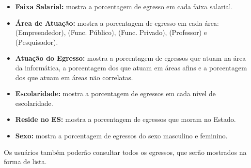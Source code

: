 \begin{itemize}
	
  	\item \textbf{Faixa Salarial:} mostra a porcentagem de egresso em cada faixa salarial.
  	
  	\item \textbf{Área de Atuação:} mostra a porcentagem de egresso em cada área: (Empreendedor), (Func. Público), (Func. Privado), (Professor) e (Pesquisador).
  	
  	\item \textbf{Atuação do Egresso:} mostra a porcentagem de egressos que atuam na área da informática, a porcentagem dos que atuam em áreas afins e a porcentagem dos que atuam em áreas não correlatas. 
  	
  	\item \textbf{Escolaridade:} mostra a porcentagem de egressos em cada nível de escolaridade. 
  	
  	\item \textbf{Reside no ES:} mostra a porcentagem de egressos que moram no Estado.
  	
  	\item \textbf{Sexo:} mostra a porcentagem de egressos do sexo masculino e feminino.
  	
  	
\end{itemize}
   
  Os usuários também poderão consultar todos os egressos, que serão mostrados na forma de lista.